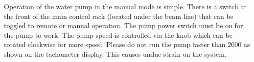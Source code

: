 Operation of the water pump in the manual mode is simple. There is
a switch at the front of the main control rack (located under the
beam line) that can be toggled to remote or manual operation. The
pump power switch must be on for the pump to work. The pump speed
is controlled via the knob which can be rotated clockwise for more
speed. Please do not run the pump faster than 2000 as shown on the
tachometer display. This causes undue strain on the system.
%
%
%
%

